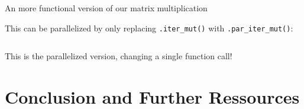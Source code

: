 \begin{listing}[H]
  \inputminted{rust}{./assets/02rayon.rs}
\caption{An more functional version of our matrix multiplication}
\end{listing}

This can be parallelized by only replacing \texttt{.iter\_mut()} with \texttt{.par\_iter\_mut()}:

\begin{listing}[H]
  \inputminted{rust}{./assets/03rayon.rs}
\caption{This is the parallelized version, changing a single function call!}
\end{listing}

\section{Conclusion and Further Ressources}

